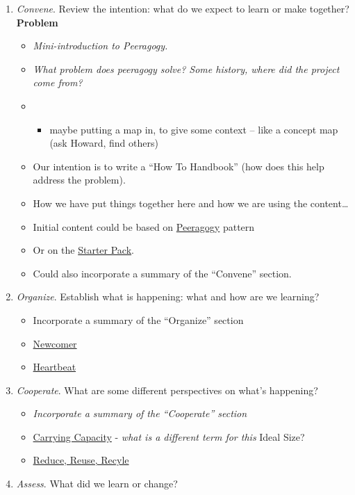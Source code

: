 \begin{enumerate}
\def\labelenumi{\arabic{enumi}.}
\tightlist
\item
  \emph{Convene}. Review the intention: what do we expect to learn or
  make together? \textbf{Problem}

  \begin{itemize}
  \item
    \emph{Mini-introduction to Peeragogy.}
  \item
    \emph{What problem does peeragogy solve? Some history, where did the
    project come from?}
  \item
    \begin{itemize}
    \tightlist
    \item
      maybe putting a map in, to give some context -- like a concept map
      (ask Howard, find others)
    \end{itemize}
  \item
    Our intention is to write a ``How To Handbook'' (how does this help
    address the problem).
  \item
    How we have put things together here and how we are using the
    content\ldots{}
  \item
    Initial content could be based on
    \href{http://peeragogy.github.io/pattern-peeragogy.html}{Peeragogy}
    pattern
  \item
    Or on the
    \href{https://docs.google.com/document/d/1w2JZhpkrYYKknpJSSJgz23PPYxI31Cu1eWvw8I9ZraM/edit}{Starter
    Pack}.
  \item
    Could also incorporate a summary of the ``Convene'' section.
  \end{itemize}
\item
  \emph{Organize}. Establish what is happening: what and how are we
  learning?

  \begin{itemize}
  \tightlist
  \item
    Incorporate a summary of the ``Organize'' section
  \item
    \href{https://hackmd.io/LvcaTX1pTESFTtAMXK8lIg}{Newcomer}
  \item
    \href{https://hackmd.io/Z-ME-AU2R-203F31uig12A}{Heartbeat}
  \end{itemize}
\item
  \emph{Cooperate}. What are some different perspectives on what's
  happening?

  \begin{itemize}
  \tightlist
  \item
    \emph{Incorporate a summary of the ``Cooperate'' section}
  \item
    \href{https://hackmd.io/1n-ksWSyQvOw-x6vomBohg}{Carrying Capacity} -
    \emph{what is a different term for this} Ideal Size?
  \item
    \href{https://hackmd.io/hEZiRQPkS02BZzwtWJcsKQ}{Reduce, Reuse,
    Recyle}
  \end{itemize}
\item
  \emph{Assess}. What did we learn or change?


\end{enumerate}
